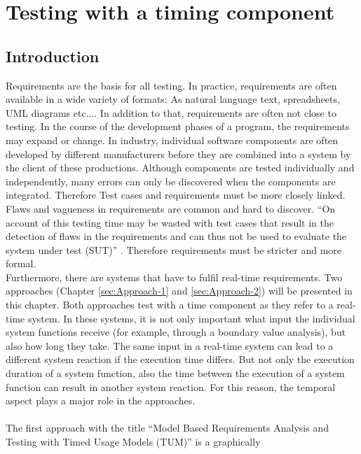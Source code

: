 \chapter{Testing with a timing component}\label{sec:topic_4}


\section{Introduction}

Requirements are the basis for all testing. In practice, requirements
are often available in a wide variety of formats: As natural language
text, spreadsheets, UML diagrams etc.... In addition to that, requirements
are often not close to testing. In the course of the development phases
of a program, the requirements may expand or change. In industry,
individual software components are often developed by different manufacturers
before they are combined into a system by the client of these productions.
Although components are tested individually and independently, many
errors can only be discovered when the components are integrated.
Therefore Test cases and requirements must be more closely linked.
Flaws and vagueness in requirements are common and hard to discover.
\enquote{On account of this testing time may be wasted with test
cases that result in the detection of flaws in the requirements and
can thus not be used to evaluate the system under test (SUT)}
\cite{Siegl2010}. Therefore requirements must be stricter and more
formal.\\
 Furthermore, there are systems that have to fulfil real-time requirements.
Two approaches (Chapter \ref{sec:Approach-1} and \ref{sec:Approach-2})
will be presented in this chapter. Both approaches test with a time
component as they refer to a real-time system. In these systems, it
is not only important what input the individual system functions receive
(for example, through a boundary value analysis), but also how long
they take. The same input in a real-time system can lead to a different
system reaction if the execution time differs. But not only the execution
duration of a system function, also the time between the execution
of a system function can result in another system reaction. For this
reason, the temporal aspect plays a major role in the approaches.\\
 \\
The first approach with the title \enquote{Model Based Requirements
Analysis and Testing with Timed Usage Models (TUM)} is a graphically
